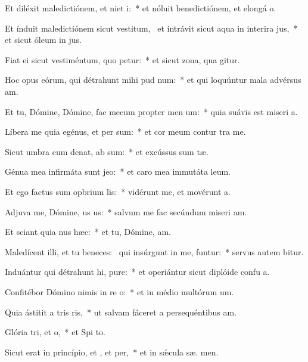 \item Et diléxit maledictiónem, et niet i:~* et nóluit benedictiónem, et elongá  o.
\item Et índuit maledictiónem sicut vestitum,~\pscross{} et intrávit sicut aqua in interira jus,~* et sicut óleum in  jus.
\item Fiat ei sicut vestiméntum, quo petur:~* et sicut zona, qua  gitur.
\item Hoc opus eórum, qui détrahunt mihi pud num:~* et qui loquúntur mala advérsus  am.
\item Et tu, Dómine, Dómine, fac mecum propter men um:~* quia suávis est miseri a.
\item Líbera me quia egénus, et per  sum:~* et cor meum contur  tra me.
\item Sicut umbra cum denat, ab sum:~* et excússus sum  tæ.
\item Génua mea infirmáta sunt  jeo:~* et caro mea immutáta   leum.
\item Et ego factus sum opbrium lis:~* vidérunt me, et movérunt  a.
\item Adjuva me, Dómine, us us:~* salvum me fac secúndum miseri am.
\item Et sciant quia nus  hæc:~* et tu, Dómine,  am.
\item Maledícent illi, et tu beneces:~\pscross{} qui insúrgunt in me, funtur:~* servus autem  bitur.
\item Induántur qui détrahunt hi, pure:~* et operiántur sicut diplóide confu a.
\item Confitébor Dómino nimis in re o:~* et in médio multórum  um.
\item Quia ástitit a tris ris,~* ut salvam fáceret a persequéntibus  am.
\item Glória tri, et o,~* et Spi to.
\item Sicut erat in princípio, et , et per,~* et in sǽcula sæ. men.
